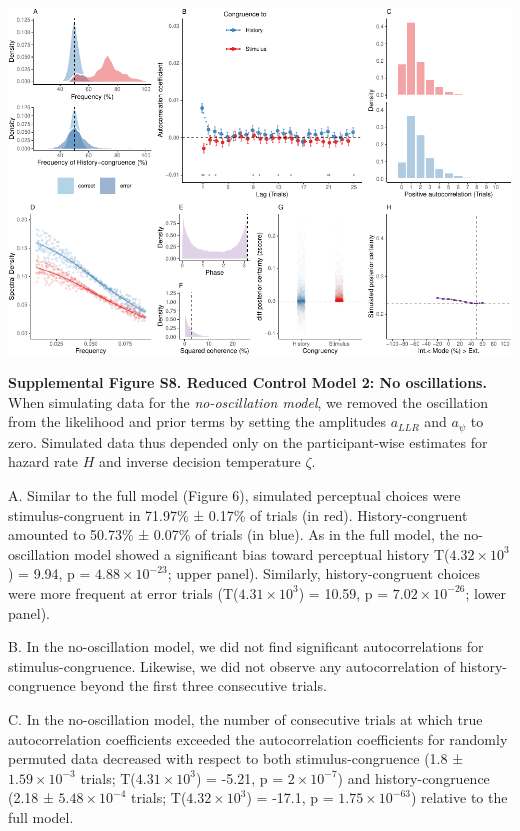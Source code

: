 \documentclass[
]{article}
\begin{document}
\includegraphics{modes_mouse_files/figure-latex/Supplemental_Figure_S8-1.pdf}

\textbf{Supplemental Figure S8. Reduced Control Model 2: No
oscillations.} When simulating data for the \emph{no-oscillation model},
we removed the oscillation from the likelihood and prior terms by
setting the amplitudes \(a_{LLR}\) and \(a_{\psi}\) to zero. Simulated
data thus depended only on the participant-wise estimates for hazard
rate \(H\) and inverse decision temperature \(\zeta\).

A. Similar to the full model (Figure 6), simulated perceptual choices
were stimulus-congruent in 71.97\% ± 0.17\% of trials (in red).
History-congruent amounted to 50.73\% ± 0.07\% of trials (in blue). As
in the full model, the no-oscillation model showed a significant bias
toward perceptual history T(\ensuremath{4.32\times 10^{3}}) = 9.94, p =
\(\ensuremath{4.88\times 10^{-23}}\); upper panel). Similarly,
history-congruent choices were more frequent at error trials
(T(\ensuremath{4.31\times 10^{3}}) = 10.59, p =
\(\ensuremath{7.02\times 10^{-26}}\); lower panel).

B. In the no-oscillation model, we did not find significant
autocorrelations for stimulus-congruence. Likewise, we did not observe
any autocorrelation of history-congruence beyond the first three
consecutive trials.

C. In the no-oscillation model, the number of consecutive trials at
which true autocorrelation coefficients exceeded the autocorrelation
coefficients for randomly permuted data decreased with respect to both
stimulus-congruence (1.8 ± \ensuremath{1.59\times 10^{-3}} trials;
T(\ensuremath{4.31\times 10^{3}}) = -5.21, p =
\(\ensuremath{2\times 10^{-7}}\)) and history-congruence (2.18 ±
\ensuremath{5.48\times 10^{-4}} trials;
T(\ensuremath{4.32\times 10^{3}}) = -17.1, p =
\(\ensuremath{1.75\times 10^{-63}}\)) relative to the full model.
\end{document}
